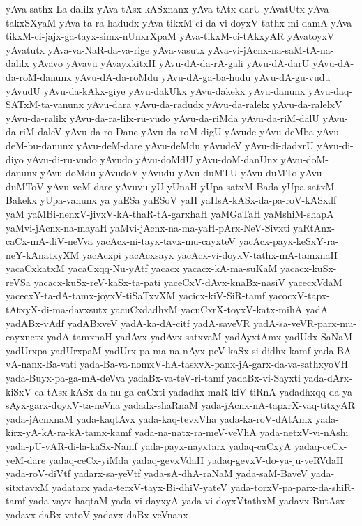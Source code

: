 {yAva-sathx-La-dalilx
yAva-tAsx-kASxnanx
yAva-tAtx-darU
yAvatUtx
yAva-takxSXyaM
yAva-ta-ra-hadudx
yAva-tikxM-ci-da-vi-doyxV-tathx-mi-damA
yAva-tikxM-ci-jajx-ga-tayx-simx-nUnxrXpaM
yAva-tikxM-ci-tAkxyAR
yAvatoyxV
yAvatutx
yAva-va-NaR-da-va-rige
yAva-vasutx
yAva-vi-jAcnx-na-saM-tA-na-dalilx
yAvavo
yAvavu
yAvayxkitxH
yAvu-dA-da-rA-gali
yAvu-dA-darU
yAvu-dA-da-roM-danunx
yAvu-dA-da-roMdu
yAvu-dA-ga-ba-hudu
yAvu-dA-gu-vudu
yAvudU
yAvu-da-kAkx-giye
yAvu-dakUkx
yAvu-dakekx
yAvu-danunx
yAvu-daq-SATxM-ta-vanunx
yAvu-dara
yAvu-da-radudx
yAvu-da-ralelx
yAvu-da-ralelxV
yAvu-da-ralilx
yAvu-da-ra-lilx-ru-vudo
yAvu-da-riMda
yAvu-da-riM-dalU
yAvu-da-riM-daleV
yAvu-da-ro-Dane
yAvu-da-roM-digU
yAvude
yAvu-deMba
yAvu-deM-bu-danunx
yAvu-deM-dare
yAvu-deMdu
yAvudeV
yAvu-di-dadxrU
yAvu-di-diyo
yAvu-di-ru-vudo
yAvudo
yAvu-doMdU
yAvu-doM-danUnx
yAvu-doM-danunx
yAvu-doMdu
yAvudoV
yAvudu
yAvu-duMTU
yAvu-duMTo
yAvu-duMToV
yAvu-veM-dare
yAvuvu
yU
yUnaH
yUpa-satxM-Bada
yUpa-satxM-Bakekx
yUpa-vanunx
ya
yaESa
yaESoV
yaH
yaHsA-kASx-da-pa-roV-kASxdf
yaM
yaMBi-nenxV-jivxV-kA-thaR-tA-garxhaH
yaMGaTaH
yaMshiM-shapA
yaMvi-jAcnx-na-mayaH
yaMvi-jAcnx-na-ma-yaH-pArx-NeV-Sivxti
yaRtAnx-caCx-mA-diV-neVva
yacAcx-ni-tayx-tavx-mu-cayxteV
yacAcx-payx-keSxY-ra-neY-kAnatxyXM
yacAcxpi
yacAcxsayx
yacAcx-vi-doyxV-tathx-mA-tamxnaH
yacaCxkatxM
yacaCxqq-Nu-yAtf
yacacx
yacacx-kA-ma-suKaM
yacacx-kuSx-reVSa
yacacx-kuSx-reV-kaSx-ta-pati
yaceCxV-dAvx-knaBx-nasiV
yacecxVdaM
yacecxY-ta-dA-tamx-joyxV-tiSaTxvXM
yacicx-kiV-SiR-tamf
yacocxV-tapx-tAtxyX-di-ma-davxsutx
yacuCxdadhxM
yacuCxrX-toyxV-katx-mihA
yadA
yadABx-vAdf
yadABxveV
yadA-ka-dA-citf
yadA-saveVR
yadA-sa-veVR-parx-mu-cayxnetx
yadA-tamxnaH
yadAvx
yadAvx-satxvaM
yadAyxtAmx
yadUdx-SaNaM
yadUrxpa
yadUrxpaM
yadUrx-pa-ma-na-nAyx-peV-kaSx-si-didhx-kamf
yada-BA-vA-nanx-Ba-vati
yada-Ba-va-nomxV-hA-tasxvX-panx-jA-garx-da-va-sathxyoVH
yada-Buyx-pa-ga-mA-deVva
yadaBx-va-teV-ri-tamf
yadaBx-vi-Sayxti
yada-dArx-kiSxV-ca-tAsx-kASx-da-nu-ga-caCxti
yadadhx-maR-kiV-tiRnA
yadadhxqq-da-ya-sAyx-garx-doyxV-ta-neVna
yadadx-shaRnaM
yada-jAcnx-nA-tapxrX-vaq-titxyAR
yada-jAcnxnaM
yada-kaqtAvx
yada-kaq-tevxVha
yada-ka-roV-dAtAmx
yada-kirx-yA-kA-ra-kA-tamx-kamf
yada-na-natx-ra-meV-veVhA
yada-netxV-vi-nAshi
yada-pU-vAR-di-la-kaSx-Namf
yada-payx-nayxtarx
yadaq-caCxyA
yadaq-ceCx-yeM-dare
yadaq-ceCx-yiMda
yadaq-gevxVdaH
yadaq-gevxV-do-ya-ju-veRVdaH
yada-roV-diVtf
yadarx-sa-yeVtf
yada-sA-dhA-raNaM
yada-saM-BaveV
yada-sitxtavxM
yadatarx
yada-terxV-tayx-Bi-dhiV-yateV
yada-torxV-pa-parx-da-shiR-tamf
yada-vayx-haqtaM
yada-vi-dayxyA
yada-vi-doyxVtathxM
yadavx-ButAsx
yadavx-daBx-vatoV
yadavx-daBx-veVnanx
}
